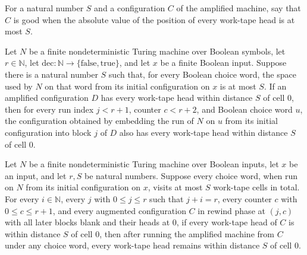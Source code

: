\begin{definition}
\label{Randomized.Amplify.Good}
\leanok
{}
For a natural number $S$ and a configuration $C$ of the amplified machine, say that $C$
is good when the absolute value of the position of every work-tape head is at most $S$.
\end{definition}

\begin{theorem}
\label{Randomized.Amplify.good_emb}
\leanok
{}
Let $N$ be a finite nondeterministic Turing machine over Boolean symbols, let
$r\in\mathbb{N}$, let $\mathrm{dec}:\mathbb{N}\to\{\mathrm{false},\mathrm{true}\}$, and
let $x$ be a finite Boolean input. Suppose there is a natural number $S$ such that, for
every Boolean choice word, the space used by $N$ on that word from its initial
configuration on $x$ is at most $S$. If an amplified configuration $D$ has every
work-tape head within distance $S$ of cell $0$, then for every run index $j<r+1$,
counter $c<r+2$, and Boolean choice word $u$, the configuration obtained by embedding
the run of $N$ on $u$ from its initial configuration into block $j$ of $D$ also has
every work-tape head within distance $S$ of cell $0$.
\end{theorem}

\begin{theorem}
\label{Randomized.Amplify.rewind_good}
\leanok
{}
Let $N$ be a finite nondeterministic Turing machine over Boolean inputs, let $x$ be an
input, and let $r,S$ be natural numbers. Suppose every choice word, when run on $N$ from
its initial configuration on $x$, visits at most $S$ work-tape cells in total. For every
$i\in\mathbb N$, every $j$ with $0\le j\le r$ such that $j+i=r$, every counter $c$ with
$0\le c\le r+1$, and every augmented configuration $C$ in rewind phase at $(j,c)$ with
all later blocks blank and their heads at $0$, if every work-tape head of $C$ is within
distance $S$ of cell $0$, then after running the amplified machine from $C$ under any
choice word, every work-tape head remains within distance $S$ of cell $0$.
\end{theorem}

